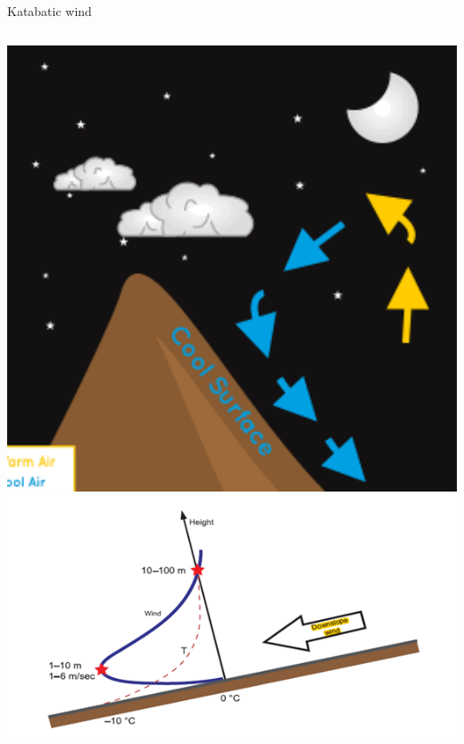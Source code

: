 \documentclass{beamer}
\begin{document}

\begin{frame}{Katabatic wind}

\begin{columns}
\includegraphics[width=1\textwidth]{kata.png}
\includegraphics[width=1\textwidth]{katabatic.png}
\end{columns}

\hfill {\tiny \cite{poulos2008observational}}
\end{frame}

\end{document}
